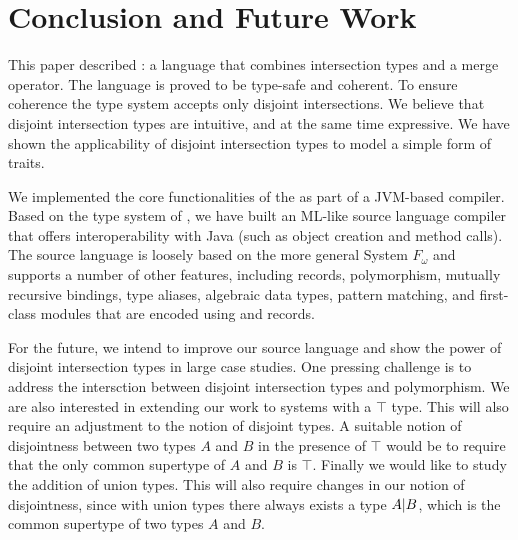 \section{Conclusion and Future Work}
\label{sec:conclusion}

This paper described \name: a language that combines
intersection types and a merge operator.
The language is proved to be type-safe and coherent.
To ensure coherence the type system accepts only
disjoint intersections. We believe that disjoint intersection types are
intuitive, and at the same time expressive. We have shown the
applicability of disjoint intersection types to model a simple form of traits.

We implemented the core functionalities of the \name as part of a JVM-based
compiler. Based on the type system of \name, we have built an ML-like
source language compiler that offers interoperability with Java (such as object
creation and method calls). The source language is loosely based on the more
general System $F_{\omega}$ and supports a
number of other features, including records, polymorphism, mutually recursive
 bindings, type aliases, algebraic data types, pattern matching, and
first-class modules that are encoded using  and records.

For the future, we intend to improve our source language
and show the power of disjoint intersection types in large case
studies. One pressing challenge is to address the intersction between 
disjoint intersection types and polymorphism.
We are also interested in extending our work
to systems with a $\top$ type. This will also require an adjustment
to the notion of disjoint types. A suitable notion of
disjointness between two types $A$ and $B$ in the presence of $\top$
would be to require that the only common supertype of $A$ and $B$ is $\top$.
Finally we would like to study the
addition of union types. This will also require changes in our
notion of disjointness, since with union types there always exists
a type $A | B$, which is the common supertype of two
types $A$ and $B$.

